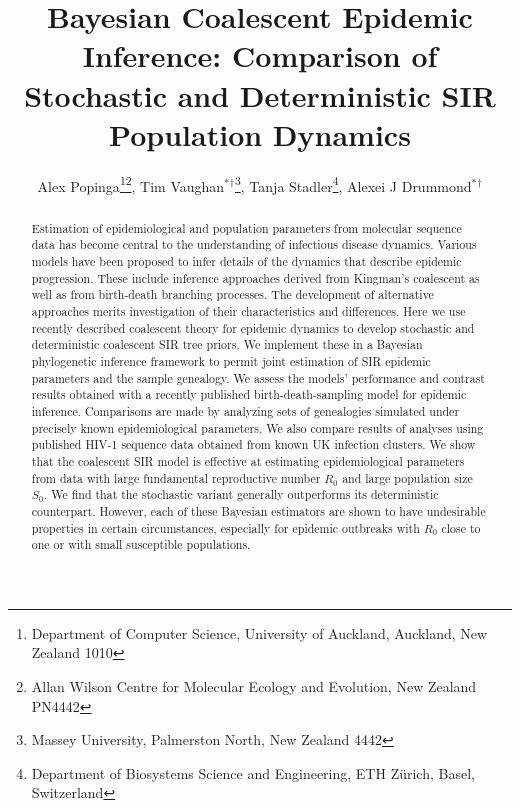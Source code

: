 \documentclass[12pt,titlepage]{article}
\title{\LARGE{Bayesian Coalescent Epidemic Inference:  Comparison of Stochastic and Deterministic SIR Population Dynamics}\\
\vspace{10mm}}
\author{Alex Popinga\thanks{Department of Computer Science, University of Auckland, Auckland, New Zealand 1010}\thanks{Allan Wilson Centre for Molecular Ecology and Evolution, New Zealand PN4442},  
Tim Vaughan$^{\ast}$$^{\dag}$\thanks{Massey University, Palmerston North, New Zealand 4442}, 
Tanja Stadler\thanks{Department of Biosystems Science and Engineering, ETH Z\"urich, Basel, Switzerland}, 
Alexei J Drummond$^{\ast}$$^{\dag}$}
\begin{document}
\maketitle



\begin{abstract}

Estimation of epidemiological and population parameters from molecular sequence data has become central to the understanding of infectious disease dynamics.  
Various models have been proposed to infer details of the dynamics that describe epidemic progression. 
These include inference approaches derived from Kingman's coalescent as well as from birth-death branching processes.  
The development of alternative approaches merits investigation of their characteristics and differences. 
Here we use recently described coalescent theory for epidemic dynamics to develop stochastic and deterministic coalescent SIR tree priors. We implement these in a Bayesian phylogenetic inference framework to permit joint estimation of SIR epidemic parameters and the sample genealogy. 
We assess the models' performance and contrast results obtained with a recently published birth-death-sampling model for epidemic inference.  
Comparisons are made by analyzing sets of genealogies
simulated under precisely known epidemiological parameters.  
We also compare results of analyses using published HIV-1 sequence data obtained from
known UK infection clusters.  
We show that the coalescent SIR model is effective at estimating epidemiological parameters from data with large fundamental reproductive number $R_0$ and large population size $S_0$. 
We find that the stochastic variant generally outperforms its deterministic counterpart.  However, each of these Bayesian estimators are shown to have undesirable properties in certain circumstances, especially for epidemic outbreaks with $R_0$ close to one or with small susceptible populations.



\end{abstract}
\end{document}

